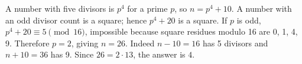 A number with five divisors is $ p^4 $ for a prime $ p $, so $ n=p^4+10 $. A number with an odd divisor count is a square; hence $ p^4+20 $ is a square. If $ p $ is odd, $ p^4+20\equiv5\pmod{16}$, impossible because square residues modulo 16 are 0, 1, 4, 9. Therefore $ p=2 $, giving $ n=26 $. Indeed $ n-10=16 $ has 5 divisors and $ n+10=36 $ has 9. Since $ 26=2\cdot13 $, the answer is $\boxed4 $.
